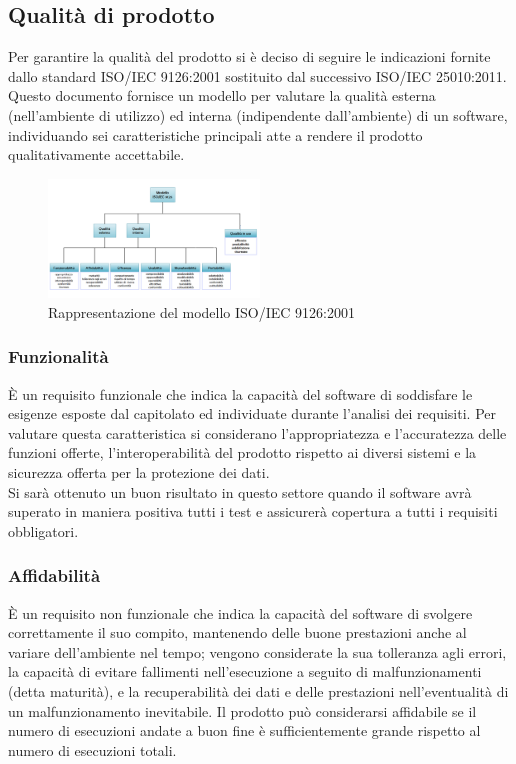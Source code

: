\subsection{Qualità di prodotto}
Per garantire la qualità del prodotto si è deciso di seguire le indicazioni fornite dallo standard ISO/IEC 9126:2001 sostituito dal successivo ISO/IEC 25010:2011. Questo documento fornisce un modello per valutare la qualità esterna (nell’ambiente di utilizzo) ed interna (indipendente dall’ambiente) di un software, individuando sei caratteristiche principali atte a rendere il prodotto qualitativamente accettabile.

\begin{figure}[h]
  \centering
    \includegraphics[width=0.5\textwidth]{./images/ISO-IEC_9126}
  \caption{Rappresentazione del modello ISO/IEC 9126:2001}
  \label{fig:ISO-IEC_9126}
\end{figure}


\subsubsection{Funzionalità}
È un requisito funzionale che indica la capacità del software di soddisfare le esigenze esposte dal capitolato ed individuate durante l’analisi dei requisiti. Per valutare questa caratteristica si considerano l'appropriatezza e l'accuratezza delle funzioni offerte, l'interoperabilità del prodotto rispetto ai diversi sistemi e la sicurezza offerta per la protezione dei dati.\\ 
Si sarà ottenuto un buon risultato in questo settore quando il software avrà superato in maniera positiva tutti i test e assicurerà copertura a tutti i requisiti obbligatori.

\subsubsection{Affidabilità}
È un requisito non funzionale che indica la capacità del software di svolgere correttamente il suo compito, mantenendo delle buone prestazioni anche al variare dell'ambiente nel tempo; vengono considerate la sua tolleranza agli errori, la capacità di evitare fallimenti nell’esecuzione a seguito di malfunzionamenti (detta maturità), e la recuperabilità dei dati e delle prestazioni nell'eventualità di un malfunzionamento inevitabile. Il prodotto può considerarsi affidabile se il numero di esecuzioni andate a buon fine è sufficientemente grande rispetto al numero di esecuzioni totali.

